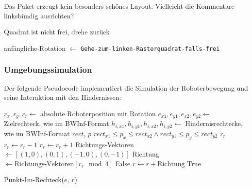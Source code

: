 \documentclass[10pt,a4paper]{article}
\newcommand{\notsure}[1]{{\color{red} #1}}
\begin{document}
\notsure{Das Paket erzeugt kein besonders schönes Layout. Vielleicht die Kommentare linksbündig ausrichten?}

\begin{algorithmic}
    \State \RobotTurnLeft
    \State \RobotTurnRight    
    \Comment Quadrat ist nicht frei, drehe zurück
    \EndIf
\EndFunction

	\State 	{}
	\EndWhile
	\State{}
	\State anfängliche-Rotation $\gets$ \RobotRotation
	\State{}
	\State \RobotTurnRight
	\State{}
	\If {\RobotMoveForward}
	\State \texttt{Gehe-zum-linken-Rasterquadrat-falls-frei}
	\Else 
	\State \RobotTurnRight
	\EndIf
	\EndWhile
\EndWhile
\end{algorithmic}


\subsubsection{Umgebungssimulation}
Der folgende Pseudocode implementiert die Simulation der Roboterbewegung und seine Interaktion mit den Hindernissen:
\begin{algorithmic}
\State $r_x, r_y, r_r \gets $ absolute Roboterposition mit Rotation
\State $e_{x1},e_{y1},  e_{x2}, e_{y2}\gets$ Zielrechteck, wie im BWInf-Format
\State $h_{i, x1},h_{i,y1},  h_{i, x2}, h_{i, y2}\gets$ Hindernisrechtecke, wie im BWInf-Format
 {$rect$, $p$}
\State\Return $rect_{x1} \leq p_{x} \leq rect_{x2} \wedge rect_{y1} \leq p_{y} \leq rect_{y2}$ 
\EndFunction
\Function {\RobotRotation} {}
\State\Return $r_r$
\EndFunction
\Function {\RobotTurnLeft} {}
\State $r_r \gets r_r - 1$
\EndFunction
\Function {\RobotTurnRight} {}
\State $r_r \gets r_r + 1$
\EndFunction
\Function {\RobotTurnAround} {}
\State \RobotTurnLeft
\State \RobotTurnLeft
\EndFunction
\Function {\RobotMoveForward} {}
\State {}
\State Richtungs-Vektoren $\gets [(1,0), (0, 1), (-1, 0), (0, -1)]$
\State Richtung $\gets \text{Richtungs-Vektoren}[r_r \mod 4]$
\State{}
\State\Return False
\EndIf
\State{}
\State $r \gets r + \text{Richtung}$
\State\Return True
\EndFunction

\Function {\RobotWon} {}
\State\Return Punkt-Im-Rechteck($e$, $r$)
\EndFunction
\end{algorithmic}
  
\end{document}
